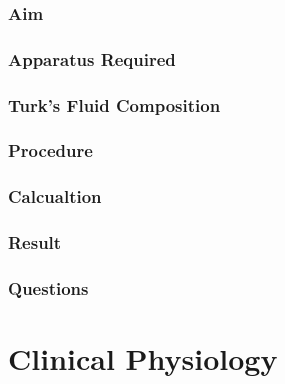\documentclass[a4paper,12pt]{book}
\begin{document}
	\section*{Aim}
	\section*{Apparatus Required}
	\section*{Turk's Fluid Composition}
	\section*{Procedure}
	\section*{Calcualtion}
	\section*{Result}
	\section*{Questions}


\part{Clinical Physiology}
\end{document}
